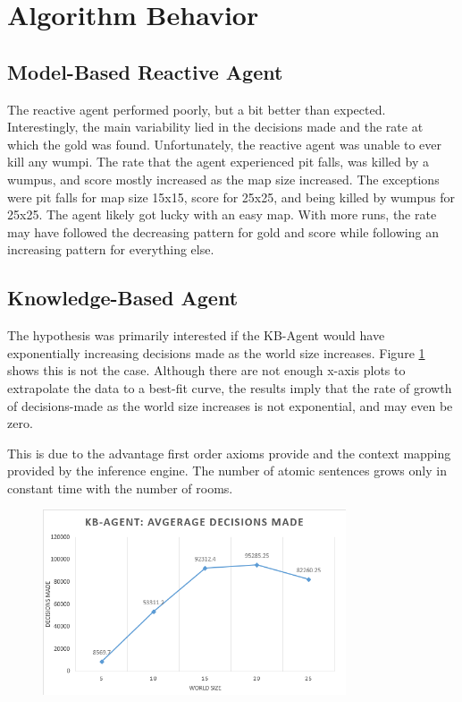 \section{Algorithm Behavior} \label{sec:alg-behavior}
\subsection{Model-Based Reactive Agent}
The reactive agent performed poorly, but a bit better than expected. Interestingly, the main variability lied in the decisions made and the rate at which the gold was found. Unfortunately, the reactive agent was unable to ever kill any wumpi. The rate that the agent experienced pit falls, was killed by a wumpus, and score mostly increased as the map size increased. The exceptions were pit falls for map size 15x15, score for 25x25, and being killed by wumpus for 25x25. The agent likely got lucky with an easy map. With more runs, the rate may have followed the decreasing pattern for gold and score while following an increasing pattern for everything else. 

\subsection{Knowledge-Based Agent}
The hypothesis was primarily interested if the KB-Agent would have exponentially increasing decisions made as the world size increases.
Figure \ref{fig:KBAvgDecisions} shows this is not the case.
Although there are not enough x-axis plots to extrapolate the data to a best-fit curve, the results imply that the rate of growth of decisions-made as the world size increases is not exponential, and may even be zero.

This is due to the advantage first order axioms provide and the context mapping provided by the inference engine.
The number of atomic sentences grows only in constant time with the number of rooms.
\begin{figure}[!htb]
	\caption{}
    \centering
	\includegraphics[width=0.8\textwidth]{figures/KBAgent_AverageDecisionsMade.PNG}
    \label{fig:KBAvgDecisions}
\end{figure}

